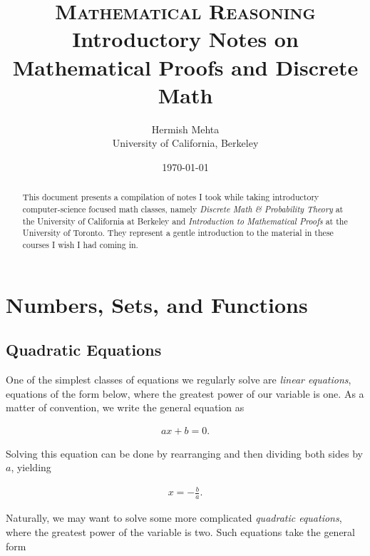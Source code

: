 \documentclass[twoside]{report}
\begin{document}
\title{\textsc{Mathematical Reasoning} \\
	\large Introductory Notes on Mathematical Proofs and Discrete Math}
\author{Hermish Mehta \\ University of California, Berkeley}
\date{\today}
\maketitle

\begin{abstract}
	This document presents a compilation of notes I took while taking introductory computer-science focused math classes, namely \emph{Discrete Math \& Probability Theory} at the University of California at Berkeley and \emph{Introduction to Mathematical Proofs} at the University of Toronto. They represent a gentle introduction to the material in these courses I wish I had coming in.
\end{abstract}

\tableofcontents

\chapter{Numbers, Sets, and Functions}

\section{Quadratic Equations}

One of the simplest classes of equations we regularly solve are \emph{linear equations}, equations of the form below, where the greatest power of our variable is one. As a matter of convention, we write the general equation as

\begin{align}
	ax + b = 0.
\end{align}

Solving this equation can be done by rearranging and then dividing both sides by $a$, yielding

\begin{align*}
	x = -\frac{b}{a}.
\end{align*}

Naturally, we may want to solve some more complicated \emph{quadratic equations}, where the greatest power of the variable is two. Such equations take the general form
\end{document}
